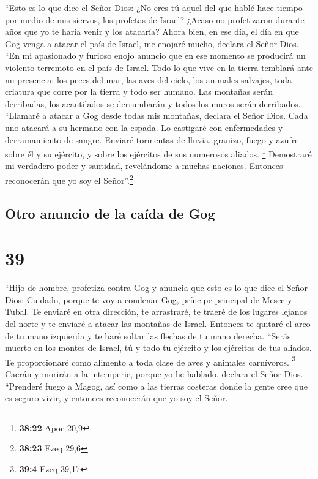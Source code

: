  ``Esto es lo que dice el Señor Dios: ¿No eres tú aquel
del que hablé hace tiempo por medio de mis siervos, los profetas de
Israel? ¿Acaso no profetizaron durante años que yo te haría venir y los
atacaría?  Ahora bien, en ese día, el día en que Gog
venga a atacar el país de Israel, me enojaré mucho, declara el Señor
Dios.  ``En mi apasionado y furioso enojo anuncio que en
ese momento se producirá un violento terremoto en el país de Israel.
 Todo lo que vive en la tierra temblará ante mi
presencia: los peces del mar, las aves del cielo, los animales salvajes,
toda criatura que corre por la tierra y todo ser humano. Las montañas
serán derribadas, los acantilados se derrumbarán y todos los muros serán
derribados.  ``Llamaré a atacar a Gog desde todas mis
montañas, declara el Señor Dios. Cada uno atacará a su hermano con la
espada.  Lo castigaré con enfermedades y derramamiento de
sangre. Enviaré tormentas de lluvia, granizo, fuego y azufre sobre él y
su ejército, y sobre los ejércitos de sus numerosos aliados. \footnote{\textbf{38:22}
  Apoc 20,9}  Demostraré mi verdadero poder y santidad,
revelándome a muchas naciones. Entonces reconocerán que yo soy el
Señor''.\footnote{\textbf{38:23} Ezeq 29,6}

\hypertarget{otro-anuncio-de-la-cauxedda-de-gog}{%
\subsection{Otro anuncio de la caída de
Gog}\label{otro-anuncio-de-la-cauxedda-de-gog}}

\hypertarget{section-38}{%
\section{39}\label{section-38}}

 ``Hijo de hombre, profetiza contra Gog y anuncia que esto
es lo que dice el Señor Dios: Cuidado, porque te voy a condenar Gog,
príncipe principal de Mesec y Tubal.  Te enviaré en otra
dirección, te arrastraré, te traeré de los lugares lejanos del norte y
te enviaré a atacar las montañas de Israel.  Entonces te
quitaré el arco de tu mano izquierda y te haré soltar las flechas de tu
mano derecha.  ``Serás muerto en los montes de Israel, tú
y todo tu ejército y los ejércitos de tus aliados. Te proporcionaré como
alimento a toda clase de aves y animales carnívoros. \footnote{\textbf{39:4}
  Ezeq 39,17}  Caerán y morirán a la intemperie, porque yo
he hablado, declara el Señor Dios.  ``Prenderé fuego a
Magog, así como a las tierras costeras donde la gente cree que es seguro
vivir, y entonces reconocerán que yo soy el Señor.

